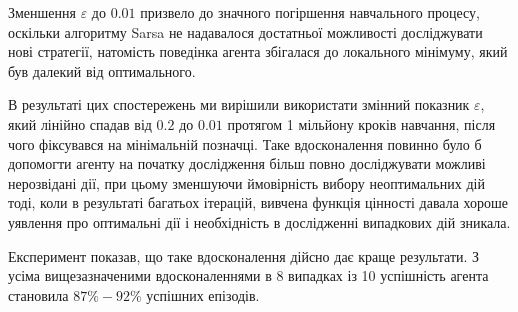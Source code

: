 Зменшення $\varepsilon$ до $0.01$ призвело до значного погіршення навчального процесу, оскільки алгоритму Sarsa не надавалося достатньої можливості досліджувати нові стратегії, натомість поведінка агента збігалася до локального мінімуму, який був далекий від оптимального.

В результаті цих спостережень ми вирішили використати змінний показник $\varepsilon$, який лінійно спадав від $0.2$ до $0.01$ протягом 1 мільйону кроків навчання, після чого фіксувався на мінімальній позначці. Таке вдосконалення повинно було б допомогти агенту на початку дослідження більш повно досліджувати можливі нерозвідані дії, при цьому зменшуючи ймовірність вибору неоптимальних дій тоді, коли в результаті багатьох ітерацій, вивчена функція цінності давала хороше уявлення про оптимальні дії і необхідність в дослідженні випадкових дій зникала.

Експеримент показав, що таке вдосконалення дійсно дає краще результати. З усіма вищезазначеними вдосконаленнями в 8 випадках із 10 успішність агента становила $87\%-92\%$ успішних епізодів.

